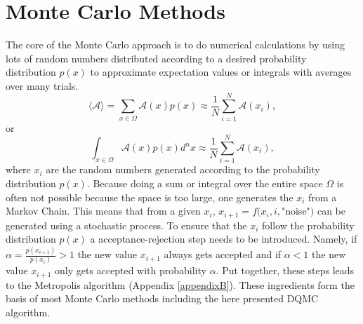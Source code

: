 \documentclass [12pt]{report}
\begin{document}
\section{Monte Carlo Methods}
The core of the Monte Carlo approach is to do numerical calculations by using lots of random numbers distributed according to a desired probability distribution $p(x)$ to approximate expectation values or integrals with averages over many trials.
\begin{equation}
\langle \mathcal{A} \rangle = \sum_{x \in \Omega} \mathcal{A}(x) p(x) \approx \frac{1}{N} \sum_{i=1}^N \mathcal{A}(x_i),
\end{equation}
or
\begin{equation}
\int_{x \in \Omega} \mathcal{A}(x) p(x) d^n x \approx \frac{1}{N} \sum_{i=1}^N \mathcal{A}(x_i),
\end{equation}
where $x_i$ are the random numbers generated according to the probability distribution $p(x)$. Because doing a sum or integral over the entire space $\Omega$ is often not possible because the space is too large, one generates the $x_i$ from a Markov Chain. This means that from a given $x_i$, $x_{i+1} = f(x_i,i,$"noise"$)$ can be generated using a stochastic process. To ensure that the $x_i$ follow the probability distribution $p(x)$ a acceptance-rejection step needs to be introduced. Namely, if $\alpha = \frac{p(x_{i+1})}{p(x_i)} > 1$ the new value $x_{i+1}$ always gets accepted and if $\alpha < 1$ the new value $x_{i+1}$ only gets accepted with probability $\alpha$. Put together, these steps leads to the Metropolis algorithm (Appendix \ref{appendixB}). These ingredients form the basis of most Monte Carlo methods including the here presented DQMC algorithm.
\end{document}
